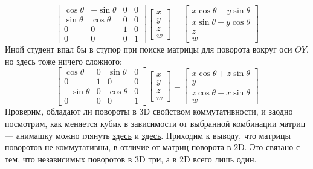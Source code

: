 \documentclass[a3paper,14pt]{extarticle}
\begin{document}
$$\begin{bmatrix}
    \cos\theta & -\sin\theta & 0 & 0 \\ \sin\theta & \cos\theta & 0 & 0 \\ 0 & 0 & 1 & 0 \\ 0 & 0 & 0 & 1
\end{bmatrix}\begin{bmatrix}
    x \\ y \\ z \\ w
\end{bmatrix} = \begin{bmatrix}
    x\cos\theta - y\sin\theta\\ x\sin\theta + y\cos\theta \\ z \\ w
\end{bmatrix}$$
Иной студент впал бы в ступор при поиске матрицы для поворота вокруг оси $OY$, но здесь тоже ничего сложного:
$$\begin{bmatrix}
    \cos\theta & 0 & \sin\theta & 0 \\ 0 & 1 & 0 & 0 \\ -\sin\theta & 0 & \cos\theta & 0 \\ 0 & 0 & 0 & 1
\end{bmatrix}\begin{bmatrix}
    x \\ y \\ z \\ w
\end{bmatrix} = \begin{bmatrix}
    x\cos\theta + z\sin\theta\\ y \\ z\cos\theta - x\sin\theta \\ w
\end{bmatrix}$$
Проверим, обладают ли повороты в 3D свойством коммутативности, и заодно посмотрим, как меняется кубик в зависимости от выбранной комбинации матриц --- анимашку можно глянуть \href{https://disk.yandex.ru/i/BNLJQFTG22JTfQ}{здесь} и \href{https://disk.yandex.ru/i/YEaJCiizGnh7AA}{здесь}. Приходим к выводу, что матрицы поворотов не коммутативны, в отличие от матриц поворота в 2D. Это связано с тем, что независимых поворотов в 3D три, а в 2D всего лишь один.
\end{document}
